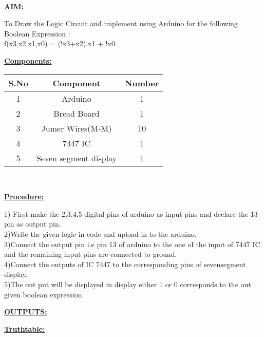 \documentclass[10pt,a4paper]{report}
\begin{document}
\\ \raggedright \textbf{\underline{AIM:}}\vspace{2mm}
\\ \raggedright To Draw the Logic Circuit and implement using Arduino for the following Boolean Expression :
\\ f(x3,x2,x1,x0) = (!x3+x2).x1 + !x0
\vspace{5mm}
\\ \raggedright \textbf{\underline{Components:}}\vspace{2mm}
\begin{table}[ht]
\centering %
\begin{tabular}{c c c} %
\hline\hline %
S.No & Component & Number \\ [0.5ex] %
\hline
1 & Arduino & 1 \\
2 & Bread Board & 1 \\
3 & Jumer Wires(M-M) & 10 \\
4 & 7447 IC & 1 \\
5 & Seven segment display & 1 \\ [1ex] 
\hline
\end{tabular}
\end{table}
\vspace{5mm}
\\ \raggedright \textbf{\underline{Procedure:}}\vspace{2mm}
\\ \raggedright 1) First make the 2,3,4,5 digital pins of arduino as input pins and declare the 13 pin as output pin.
\\ 2)Write the given logic in code and upload in to the arduino.
\\ 3)Connect the output pin i.e pin 13 of arduino to the one of the input of 7447 IC and the remaining input pins are connected to ground.
\\ 4)Connect the outputs of IC 7447 to the corresponding pins of sevensegment display.
\\ 5)The out put will be displayed in display either 1 or 0 corresponds to the out given boolean expression.
\vspace{5mm}
\\ \raggedright \textbf{\underline{OUTPUTS:}}\vspace{7mm}
\\ \raggedright \textbf{\underline{Truthtable:}}\vspace{2mm}
\end{document}
